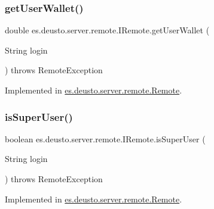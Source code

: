 \mbox{\label{interfacees_1_1deusto_1_1server_1_1remote_1_1_i_remote_a53305dbc72d910c932e66e2c27c5e1bb}} 
\subsubsection{\texorpdfstring{get\+User\+Wallet()}{getUserWallet()}}
{\footnotesize\ttfamily double es.\+deusto.\+server.\+remote.\+I\+Remote.\+get\+User\+Wallet (\begin{DoxyParamCaption}\item[{String}]{login }\end{DoxyParamCaption}) throws Remote\+Exception}



Implemented in \hyperlink{classes_1_1deusto_1_1server_1_1remote_1_1_remote_af7cc190cccf69cda838a6d9805c5c2f5}{es.\+deusto.\+server.\+remote.\+Remote}.

\mbox{\label{interfacees_1_1deusto_1_1server_1_1remote_1_1_i_remote_a488f8b57271876e219af445345428d73}} 
\subsubsection{\texorpdfstring{is\+Super\+User()}{isSuperUser()}}
{\footnotesize\ttfamily boolean es.\+deusto.\+server.\+remote.\+I\+Remote.\+is\+Super\+User (\begin{DoxyParamCaption}\item[{String}]{login }\end{DoxyParamCaption}) throws Remote\+Exception}



Implemented in \hyperlink{classes_1_1deusto_1_1server_1_1remote_1_1_remote_ac7d2e76813b61b5a9fcf33d89b6e08c4}{es.\+deusto.\+server.\+remote.\+Remote}.

